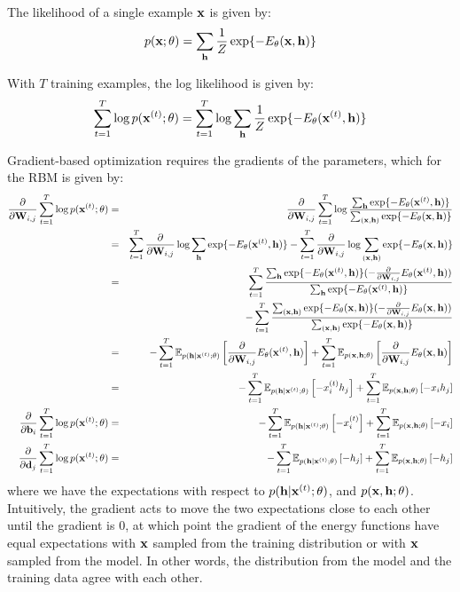 \documentclass[11pt]{article}
\newcommand{\vx}{{\bf x}}
\newcommand{\vh}{{\bf h}}
\newcommand{\vb}{{\bf b}}
\newcommand{\vd}{{\bf d}}
\newcommand{\W}{{\bf W}}
\begin{document}
The likelihood of a single example $\vx$ is given by:
\begin{equation}
p(\vx;\theta) = \sum_{\vh} \frac{1}{Z} \exp\{-E_\theta(\vx, \vh)\}
\end{equation}

With $T$ training examples, the log likelihood is given by:
\begin{equation}
\sum_{t=1}^T \log p(\vx^{(t)};\theta) = \sum_{t=1}^T \log \sum_{\vh} \frac{1}{Z} \exp\{-E_\theta(\vx^{(t)}, \vh)\}
\end{equation}

Gradient-based optimization requires the gradients of the parameters, which for the RBM is given by:
\begin{eqnarray}
\nonumber
\frac{\partial}{\partial \W_{i,j}}\sum_{t=1}^T \log p(\vx^{(t)};\theta) &=& \frac{\partial}{\partial \W_{i,j}}\sum_{t=1}^T \log \frac{\sum_{\vh}\exp\{-E_\theta(\vx^{(t)},\vh)\}}{\sum_{(\vx,\vh)}\exp\{-E_\theta(\vx,\vh)\}} \\\nonumber
&=& \sum_{t=1}^T \frac{\partial}{\partial \W_{i,j}} \log \sum_{\vh}\exp\{-E_\theta(\vx^{(t)},\vh)\} - \sum_{t=1}^T \frac{\partial}{\partial \W_{i,j}} \log\sum_{(\vx,\vh)}\exp\{-E_\theta(\vx,\vh)\}\\\nonumber
&=& \sum_{t=1}^T \frac{\sum_{\vh} \exp\{-E_\theta(\vx^{(t)},\vh)\}(-\frac{\partial}{\partial \W_{i,j}}E_\theta(\vx^{(t)},\vh))}{\sum_{\vh} \exp\{-E_\theta(\vx^{(t)},\vh)\}}\\\nonumber
&&-\sum_{t=1}^T \frac{\sum_{(\vx,\vh)} \exp\{-E_\theta(\vx,\vh)\}(-\frac{\partial}{\partial \W_{i,j}}E_\theta(\vx,\vh))}{\sum_{(\vx,\vh)} \exp\{-E_\theta(\vx,\vh)\}} \\\nonumber
&=& -\sum_{t=1}^T \mathbb{E}_{p(\vh|\vx^{(t)};\theta)}\left[\frac{\partial}{\partial \W_{i,j}}E_\theta(\vx^{(t)},\vh)\right]+ \sum_{t=1}^T \mathbb{E}_{p(\vx,\vh;\theta)}\left[\frac{\partial}{\partial \W_{i,j}}E_\theta(\vx,\vh)\right] \\ \label{eq:der1}
&=& -\sum_{t=1}^T \mathbb{E}_{p(\vh|\vx^{(t)};\theta)}\left[-x_i^{(t)}h_j\right]+ \sum_{t=1}^T \mathbb{E}_{p(\vx,\vh;\theta)}\left[-x_ih_j\right] \\ \label{eq:der2}
\frac{\partial}{\partial \vb_i} \sum_{t=1}^T \log p(\vx^{(t)};\theta) &=& -\sum_{t=1}^T \mathbb{E}_{p(\vh|\vx^{(t)};\theta)}\left[-x_i^{(t)}\right]+ \sum_{t=1}^T \mathbb{E}_{p(\vx,\vh;\theta)}\left[-x_i\right] \\\label{eq:der3}
\frac{\partial}{\partial \vd_j} \sum_{t=1}^T \log p(\vx^{(t)};\theta) &=& -\sum_{t=1}^T \mathbb{E}_{p(\vh|\vx^{(t)};\theta)}\left[-h_j\right]+ \sum_{t=1}^T \mathbb{E}_{p(\vx,\vh;\theta)}\left[-h_j\right]
\end{eqnarray}
where we have the expectations with respect to $p(\vh|\vx^{(t)};\theta)$, and  $p(\vx,\vh;\theta)$. Intuitively, the gradient acts
to move the two expectations close to each other until the gradient is 0, at which point the gradient of the energy functions have equal expectations with $\vx$ sampled from the training distribution or with $\vx$ sampled from the model. In other words, the distribution from the model and the training data agree with each other.
\end{document}
